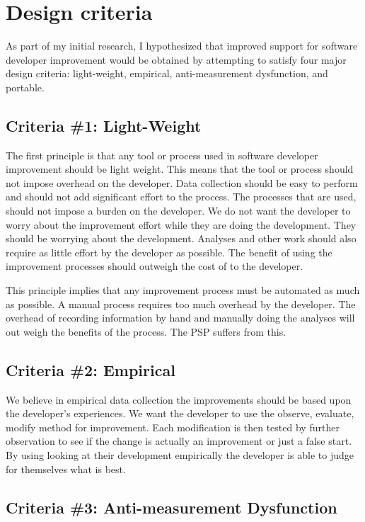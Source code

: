 \section{Design criteria}

As part of my initial research, I hypothesized that improved support for
software developer improvement would be obtained by attempting to satisfy four
major design criteria: light-weight, empirical, anti-measurement dysfunction,
and portable.

\subsection{Criteria \#1: Light-Weight}

The first principle is that any tool or process used in software developer
improvement should be light weight.  This means that the tool or process should 
not impose overhead on the developer.  Data collection should be easy to
perform and should not add significant effort to the process.  The processes
that are used, should not impose a burden on the developer. We do not want the
developer to worry about the improvement effort while they are doing the
development.  They should be worrying about the development.  Analyses and other 
work should also require as little effort by the developer as possible.  The
benefit of using the improvement processes should outweigh the cost of to the
developer.

This principle implies that any improvement process must be automated as much
as possible.  A manual process requires too much overhead by the developer.
The overhead of recording information by hand and manually doing the analyses
will out weigh the benefits of the process.  The PSP suffers from this.

\subsection{Criteria \#2: Empirical}

We believe in empirical data collection the improvements should be based upon
the developer's experiences. We want the developer to use the observe,
evaluate, modify method for improvement.  Each modification is then tested by
further observation to see if the change is actually an improvement or just a 
false start.  By using looking at their development empirically the developer
is able to judge for themselves what is best.

\subsection{Criteria \#3: Anti-measurement Dysfunction}


